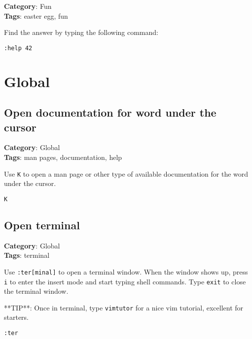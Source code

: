 {{{{{\textbf{Category}: Fun\\ \textbf{Tags}: easter egg, fun
\vspace{0.5cm}

Find the answer by typing the following command:

\begin{Exa*}{}
\begin{Verbatim}[fontsize=\footnotesize, breaklines, breakanywhere]
:help 42
\end{Verbatim}
\end{Exa*}

\chapter{Global}
\section{Open documentation for word under the cursor}

\textbf{Category}: Global\\ \textbf{Tags}: man pages, documentation, help
\vspace{0.5cm}

Use {\footnotesize \Verb§K§} to open a man page or other type of available documentation for the word under the cursor. 

\begin{Exa*}{}
\begin{Verbatim}[fontsize=\footnotesize, breaklines, breakanywhere]
K
\end{Verbatim}
\end{Exa*}

\section{Open terminal}

\textbf{Category}: Global\\ \textbf{Tags}: terminal
\vspace{0.5cm}

Use {\footnotesize \Verb§:ter[minal]§} to open a terminal window. When the window shows up, press {\footnotesize \Verb§i§} to enter the insert mode and start typing shell commands. Type {\footnotesize \Verb§exit§} to close the terminal window. 

**TIP**: Once in terminal, type {\footnotesize \Verb§vimtutor§} for a nice vim tutorial, excellent for starters.

\begin{Exa*}{}
\begin{Verbatim}[fontsize=\footnotesize, breaklines, breakanywhere]
:ter
\end{Verbatim}
\end{Exa*}

}}}}}
